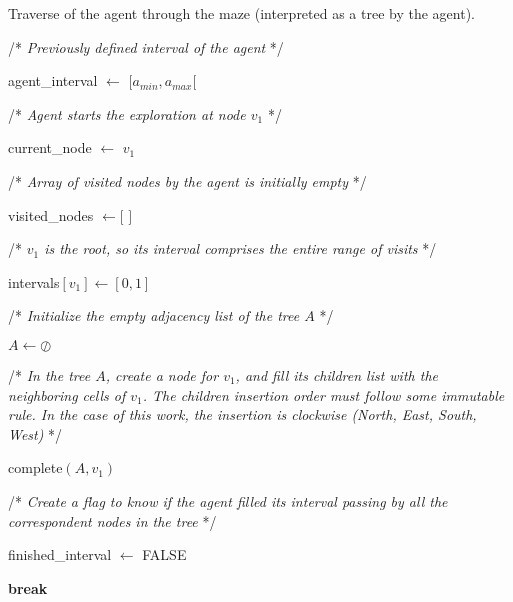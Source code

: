 \begin{algorithm}
\caption{Traverse of the agent through the maze (interpreted as a tree by the agent).}
\label{pseudocode_1}
\begin{algorithmic}%
\State /* \textit{Previously defined interval of the agent} */

\State agent\_interval $\gets$ $[a_{min},a_{max}[$

\State

\State /* \textit{Agent starts the exploration at node $v_{1}$} */

\State current\_node $\gets$ $v_{1}$

\State

\State /* \textit{Array of visited nodes by the agent is initially empty} */

\State visited\_nodes $\gets [$ $ ]$

\State

\State /* \textit{$v_{1}$ is the root, so its interval comprises the entire range of visits} */

\State intervals$[v_{1}] \gets [0,1]$

\State

\State /* \textit{Initialize the empty adjacency list of the tree $A$} */

\State $A \gets \oslash$

\State

\State /* \textit{In the tree $A$, create a node for $v_{1}$, and fill its children list with the neighboring cells of $v_{1}$. The children insertion order must follow some immutable rule. In the case of this work, the insertion is clockwise (North, East, South, West)} */

\State complete$(A, v_{1})$

\State

\State /* \textit{Create a flag to know if the agent filled its interval passing by all the correspondent nodes in the tree} */

\State finished\_interval $\gets$ FALSE

\State

\State



 

\State \textbf{break} 


\end{algorithmic}
\end{algorithm}
